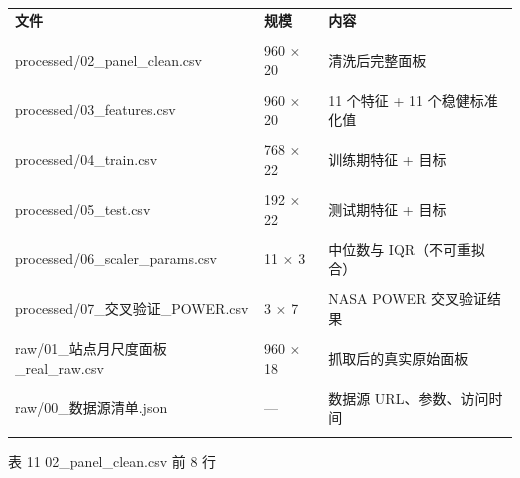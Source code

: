 \documentclass[11pt,a4paper]{ctexart}
\begin{document}
\begin{table}[H]\centering\small\setlength{\parskip}{2pt}
\begin{tabularx}{\textwidth}{|X|X|X|}
\toprule
\textbf{文件} & \textbf{规模} & \textbf{内容} \\\\
\midrule
processed/02\_panel\_clean.csv & 960 $\times$ 20 & 清洗后完整面板 \\\\
processed/03\_features.csv & 960 $\times$ 20 & 11 个特征 + 11 个稳健标准化值 \\\\
processed/04\_train.csv & 768 $\times$ 22 & 训练期特征 + 目标 \\\\
processed/05\_test.csv & 192 $\times$ 22 & 测试期特征 + 目标 \\\\
processed/06\_scaler\_params.csv & 11 $\times$ 3 & 中位数与 IQR（不可重拟合） \\\\
processed/07\_交叉验证\_POWER.csv & 3 $\times$ 7 & NASA POWER 交叉验证结果 \\\\
raw/01\_站点月尺度面板\_real\_raw.csv & 960 $\times$ 18 & 抓取后的真实原始面板 \\\\
raw/00\_数据源清单.json & — & 数据源 URL、参数、访问时间 \\\\
\bottomrule
\end{tabularx}
\end{table}
表 11  02\_panel\_clean.csv 前 8 行
\end{document}

